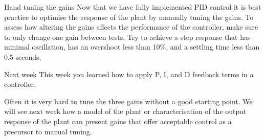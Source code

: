 \documentclass[9pt]{beamer-control}
\begin{document}

\begin{frame}{Hand tuning the gains}
Now that we have fully implemented PID control it is best practice to optimise the response of the plant by manually tuning the gains. To assess how altering the gains affects the performance of the controller, make sure to only change one gain between tests. Try to achieve a step response that has minimal oscillation, has an overshoot less than 10\%, and a settling time less than 0.5 seconds.\\
\end{frame}

\begin{frame}{Next week}
This week you learned how to apply P, I, and D feedback terms in a controller.

Often it is very hard to tune the three gains without a good starting point. We will see next week how a model of the plant or characterisation of the output response of the plant can present gains that offer acceptable control as a precursor to manual tuning. 
\end{frame}
\end{document}
